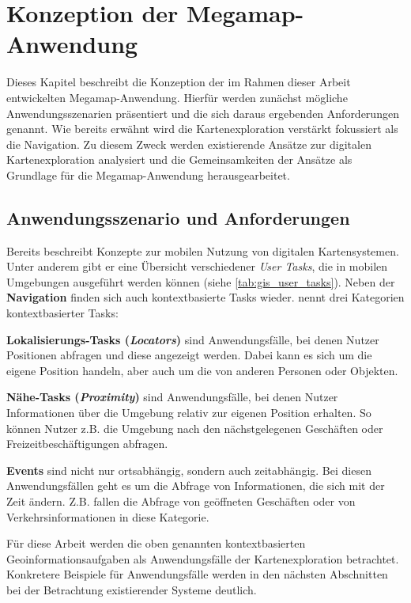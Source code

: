 \chapter{Konzeption der Megamap-Anwendung}
\label{chap:concept}
Dieses Kapitel beschreibt die Konzeption der im Rahmen dieser Arbeit entwickelten Megamap-Anwendung.
Hierfür werden zunächst mögliche Anwendungsszenarien präsentiert und die sich daraus ergebenden Anforderungen genannt.
Wie bereits erwähnt wird die Kartenexploration verstärkt fokussiert als die Navigation.
Zu diesem Zweck werden existierende Ansätze zur digitalen Kartenexploration analysiert und die Gemeinsamkeiten der Ansätze als Grundlage für die Megamap-Anwendung herausgearbeitet.

\section{Anwendungsszenario und Anforderungen}
Bereits \textcite{Reichenbacher2001} beschreibt Konzepte zur mobilen Nutzung von digitalen Kartensystemen.
Unter anderem gibt er eine Übersicht verschiedener \emph{User Tasks}, die in mobilen Umgebungen ausgeführt werden können (siehe \autoref{tab:gis_user_tasks}).
Neben der \textbf{Navigation} finden sich auch kontextbasierte Tasks wieder.
\citeauthor{Reichenbacher2001} nennt drei Kategorien kontextbasierter Tasks:

\textbf{Lokalisierungs-Tasks (\emph{Locators})} sind Anwendungsfälle, bei denen Nutzer Positionen abfragen und diese angezeigt werden.
Dabei kann es sich um die eigene Position handeln, aber auch um die von anderen Personen oder Objekten.

\textbf{Nähe-Tasks (\emph{Proximity})} sind Anwendungsfälle, bei denen Nutzer Informationen über die Umgebung relativ zur eigenen Position erhalten.
So können Nutzer z.B. die Umgebung nach den nächstgelegenen Geschäften oder Freizeitbeschäftigungen abfragen.

\textbf{Events} sind nicht nur ortsabhängig, sondern auch zeitabhängig.
Bei diesen Anwendungsfällen geht es um die Abfrage von Informationen, die sich mit der Zeit ändern.
Z.B. fallen die Abfrage von geöffneten Geschäften oder von Verkehrsinformationen in diese Kategorie.

Für diese Arbeit werden die oben genannten kontextbasierten Geoinformationsaufgaben als Anwendungsfälle der Kartenexploration betrachtet.
Konkretere Beispiele für Anwendungsfälle werden in den nächsten Abschnitten bei der Betrachtung existierender Systeme deutlich.

